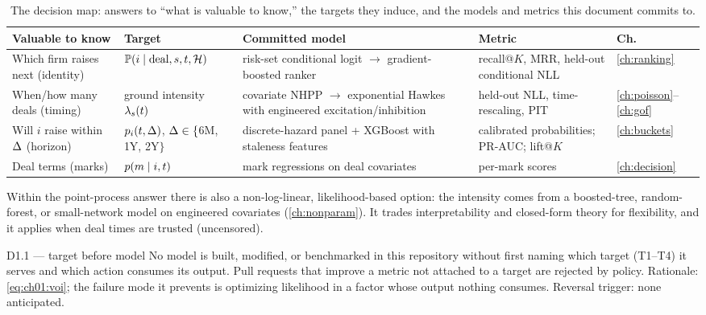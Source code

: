 \begin{table}[htbp]
\centering
\small
\begin{tabular}{p{} p{} p{} p{} p{}}
\toprule
\textbf{Valuable to know} & \textbf{Target} & \textbf{Committed model} &
\textbf{Metric} & \textbf{Ch.} \\
\midrule
Which firm raises next (identity) &
$\mathbb{P}(i \mid \text{deal}, s, t, \mathcal{H})$ &
risk-set conditional logit $\to$ gradient-boosted ranker &
recall@$K$, MRR, held-out conditional NLL & \ref{ch:ranking} \\
\addlinespace
When/how many deals (timing) &
ground intensity $\lambda_s(t)$ &
covariate NHPP $\to$ exponential Hawkes with engineered
excitation/inhibition &
held-out NLL, time-rescaling, PIT & \ref{ch:poisson}--\ref{ch:gof} \\
\addlinespace
Will $i$ raise within $\Delta$ (horizon) &
$p_i(t,\Delta)$, $\Delta\in\{$6M, 1Y, 2Y$\}$ &
discrete-hazard panel + XGBoost with staleness features &
calibrated probabilities; PR-AUC; lift@$K$ & \ref{ch:buckets} \\
\addlinespace
Deal terms (marks) &
$p(m \mid i, t)$ &
mark regressions on deal covariates &
per-mark scores & \ref{ch:decision} \\
\bottomrule
\end{tabular}
\caption{The decision map: answers to ``what is valuable to know,'' the
targets they induce, and the models and metrics this document commits to.}
\label{tab:ch01:map}
\end{table}

Within the point-process answer there is also a non-log-linear,
likelihood-based option: the intensity comes from a boosted-tree,
random-forest, or small-network model on engineered covariates
(\cref{ch:nonparam}). It trades interpretability and closed-form theory
for flexibility, and it applies when deal times are trusted (uncensored).

\begin{decision}{D1.1 --- target before model}
No model is built, modified, or benchmarked in this repository without first
naming which target (T1--T4) it serves and which action consumes its output.
Pull requests that improve a metric not attached to a target are rejected by
policy. Rationale: \cref{eq:ch01:voi}; the failure mode it prevents is
optimizing likelihood in a factor whose output nothing consumes.
Reversal trigger: none anticipated.
\end{decision}

